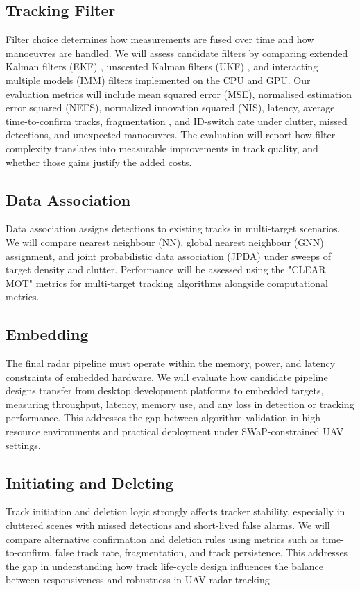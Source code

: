 \subsection{Tracking Filter}
Filter choice determines how measurements are fused over time and how manoeuvres are handled. We will assess candidate filters by comparing extended Kalman filters (EKF) \cite{jazwinski1970stochastic}, unscented Kalman filters (UKF) \cite{julier1997newextension}, and interacting multiple models (IMM) \cite{blom1988imm} filters implemented on the CPU and GPU. Our evaluation metrics will include mean squared error (MSE), normalised estimation error squared (NEES), normalized innovation squared (NIS), latency, average time-to-confirm tracks, fragmentation \cite{hem2021maritime_mtt_metrics}, and ID-switch rate under clutter, missed detections, and unexpected manoeuvres. The evaluation will report how filter complexity translates into measurable improvements in track quality, and whether those gains justify the added costs.

\subsection{Data Association}
Data association assigns detections to existing tracks in multi-target scenarios. We will compare nearest neighbour (NN), global nearest neighbour (GNN) assignment, and joint probabilistic data association (JPDA) under sweeps of target density and clutter. Performance will be assessed using the "CLEAR MOT" metrics for multi-target tracking algorithms \cite{article} alongside computational metrics.

\subsection{Embedding}
The final radar pipeline must operate within the memory, power, and latency constraints of embedded hardware. We will evaluate how candidate pipeline designs transfer from desktop development platforms to embedded targets, measuring throughput, latency, memory use, and any loss in detection or tracking performance. This addresses the gap between algorithm validation in high-resource environments and practical deployment under SWaP-constrained UAV settings.

\subsection{Initiating and Deleting}
Track initiation and deletion logic strongly affects tracker stability, especially in cluttered scenes with missed detections and short-lived false alarms. We will compare alternative confirmation and deletion rules using metrics such as time-to-confirm, false track rate, fragmentation, and track persistence. This addresses the gap in understanding how track life-cycle design influences the balance between responsiveness and robustness in UAV radar tracking.